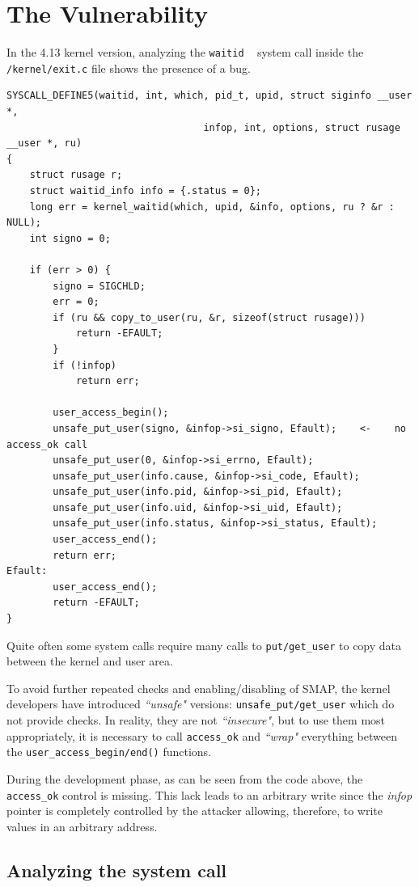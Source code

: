 \documentclass{masterthesis}
\begin{document}
\section{The Vulnerability}
\label{sect:vulnerability_17}
In the 4.13 kernel version, analyzing the \texttt{waitid} ~\cite{waitid} system call inside the \texttt{/kernel/exit.c} file shows the presence of a bug.
\begin{lstlisting}
SYSCALL_DEFINE5(waitid, int, which, pid_t, upid, struct siginfo __user *,
                                  infop, int, options, struct rusage __user *, ru)
{
    struct rusage r;
    struct waitid_info info = {.status = 0};
    long err = kernel_waitid(which, upid, &info, options, ru ? &r : NULL);
    int signo = 0;

    if (err > 0) {
        signo = SIGCHLD;
        err = 0;
        if (ru && copy_to_user(ru, &r, sizeof(struct rusage)))
            return -EFAULT;
        }
        if (!infop)
            return err;

        user_access_begin();
        unsafe_put_user(signo, &infop->si_signo, Efault);    <-    no access_ok call
        unsafe_put_user(0, &infop->si_errno, Efault);
        unsafe_put_user(info.cause, &infop->si_code, Efault);
        unsafe_put_user(info.pid, &infop->si_pid, Efault);
        unsafe_put_user(info.uid, &infop->si_uid, Efault);
        unsafe_put_user(info.status, &infop->si_status, Efault);
        user_access_end();
        return err;
Efault:
        user_access_end();
        return -EFAULT;
}
\end{lstlisting}
Quite often some system calls require many calls to \texttt{put/get_user} to copy data between the kernel and user area.

To avoid further repeated checks and enabling/disabling of SMAP, the kernel developers have introduced \emph{``unsafe"} versions: \texttt{unsafe_put/get_user} which do not provide checks.
In reality, they are not \emph{``insecure"}, but to use them most appropriately, it is necessary to call \texttt{access\_ok} and \emph{``wrap"} everything between the \texttt{user_access_begin/end()} functions.


During the development phase, as can be seen from the code above, the \texttt{access_ok} control is missing.
This lack leads to an arbitrary write since the \textit{infop} pointer is completely controlled by the attacker allowing, therefore, to write values in an arbitrary address.

\subsection{Analyzing the system call}
\label{subsect:waitid}
\end{document}
